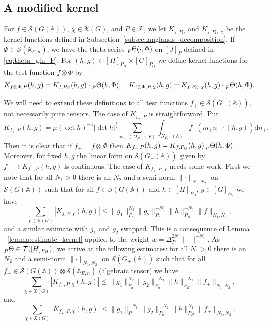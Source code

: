 \documentclass[letterpaper,11pt]{amsart}
\newcommand{\fX}{\mathfrak{X}}
\newcommand{\bA}{\mathbb{A}}
\newcommand{\cF}{\mathcal{F}}
\newcommand{\cS}{\mathcal{S}}
\newcommand{\cT}{\mathcal{T}}
\newcommand{\rd}{\mathrm{d}}
\newcommand{\<}{\negthickspace}
\providecommand{\abs}[1]{\lvert#1\rvert}
\providecommand{\aabs}[1]{\lVert#1\rVert}
\providecommand{\Abs}[1]{\left\lvert#1\right\rvert}
\theoremstyle{definition}
\theoremstyle{plain}
\theoremstyle{remark}
\numberwithin{equation}{section}
\begin{document}
\subsection{A modified kernel}  \label{subsec:modified_kernel_1}
For $f \in \cS(G(\bA))$, $\chi \in \fX(G)$, and $P \in \cF$,
we let $K_{f, P_G}$ and $K_{f, P_G, \chi}$ be the kernel functions defined in
Subsection~\ref{subsec:langlands_decomposition}. If $\Phi \in \cS(\bA_{E,
n})$, we have the theta series $\prescript{}{P}{\Theta}(\cdot, \Phi)$ on
$[J]_{P}$ defined in \eqref{eq:theta_gln_P}. For $(h, g) \in [H]_{P_H} \times [G]_{P_G}$ we define kernel functions for the test function $f \otimes \Phi$ by
\begin{equation}
\label{eq:kernel_gln+}
     K_{f \otimes \Phi, P}(h, g) = K_{f, P_G}(h, g) \cdot
    \prescript{}{P}{\Theta}(h, \Phi), \quad
    K_{f \otimes \Phi, P, \chi}(h, g) = K_{f, P_G, \chi}(h, g) \cdot
    \prescript{}{P}{\Theta}(h, \Phi).
\end{equation}


We will need to extend these definitions to all test functions $f_+ \in
\cS(G_+(\bA))$, not necessarily pure tensors. The case of $K_{f_+, P}$ is
straightforward. Put
    \[
    K_{f_+ ,P}(h, g) = \mu(\det h)^{-1} \abs{\det h}^{\frac{1}{2}}
    \sum_{m_+ \in M_{P, +}(F)} \int_{N_{P, +}(\bA)}
    f_+(m_+ n_+\cdot (h, g)) \rd n_+.
    \]
Then it is clear that if $f_+ = f \otimes \Phi$ then $K_{f_+ ,P}(h, g) =
K_{f, P_G}(h, g) \prescript{}{P}{\Theta}(h, \Phi)$. Moreover, for
fixed $h, g$ the linear form on $\cS(G_+(\bA))$ given by $f_+ \mapsto
K_{f_+,P}(h, g)$ is continuous. The case of $K_{f_+, P, \chi}$ needs some work.
First we note that for all $N_1>0$ there is an $N_2$ and a semi-norm
$\aabs{\cdot}_{N_1, N_2}$ on $\cS(G(\bA))$ such that for all $f \in
\cS(G(\bA))$ and $h \in [H]_{P_H}$, $g \in [G]_{P_G}$ we have
    \begin{equation}    \label{eq:estimate_kernel_GL_strong}
    \sum_{\chi \in \fX(G)} \Abs{K_{f, P, \chi}(h, g)} \leq
    \aabs{g_1}^{N_2}_{P_n} \aabs{g_2}_{P_n}^{-N_1}
    \aabs{h}_{P_H}^{-N_1} \aabs{f}_{N_1, N_2},
    \end{equation}
and a similar estimate with $g_1$ and $g_2$ swapped. This is a consequence of
Lemma ~\ref{lemma:estimate_kernel} applied to the weight $w =
\Delta_P^{2N_1} \aabs{\cdot}^{-N_1}$. As $\prescript{}{P}{\Theta} \in
\cT([H]_{P_H})$, we arrive at the following estimates: for all $N_1>0$ there
is an $N_2$ and a semi-norm $\aabs{\cdot}_{N_1, N_2}$ on $\cS(G_+(\bA))$ such
that for all $f_+ \in \cS(G(\bA)) \otimes \cS(\bA_{E, n})$ (algebraic tensor)
we have
    \begin{equation}    \label{eq:extension_kernel_estimate1}
    \sum_{\chi \in \fX(G)} \Abs{K_{f_+, P, \chi}(h, g)} \leq
    \aabs{g_1}_{P_n}^{N_2} \aabs{g_2}_{P_n}^{-N_1}
    \aabs{h}_{P_H}^{-N_1} \aabs{f_+}_{N_1, N_2},
    \end{equation}
and
    \begin{equation}    \label{eq:extension_kernel_estimate2}
    \sum_{\chi \in \fX(G)} \Abs{K_{f_+, P, \chi}(h, g)} \leq
    \aabs{g_1}_{P_n}^{-N_2} \aabs{g_2}_{P_n}^{-N_2}
    \aabs{h}_{P_H}^{N_1} \aabs{f_+}_{N_1, N_2}.
    \end{equation}
\end{document}
